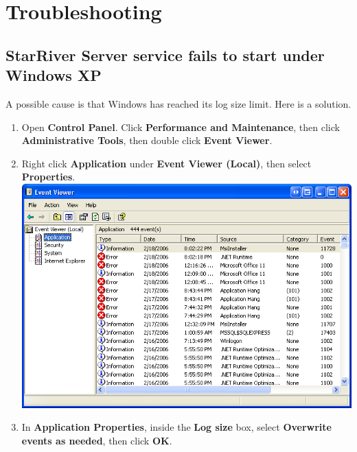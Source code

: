 \section{Troubleshooting}\label{troubleshooting}

\subsection{StarRiver Server service fails to start under Windows
XP}\label{starriver-server-service-fails-to-start-under-windows-xp}

A possible cause is that Windows has reached its log size limit. Here is
a solution.

\begin{enumerate}
\def\labelenumi{\arabic{enumi}.}
\itemsep1pt\parskip0pt
\item
  Open \textbf{Control Panel}. Click \textbf{Performance and
  Maintenance}, then click \textbf{Administrative Tools}, then double
  click \textbf{Event Viewer}.
\item
  Right click \textbf{Application} under \textbf{Event Viewer (Local)},
  then select \textbf{Properties}. \includegraphics{img/winxp_event.png}
\item
  In \textbf{Application Properties}, inside the \textbf{Log size} box,
  select \textbf{Overwrite events as needed}, then click \textbf{OK}.

\end{enumerate}
